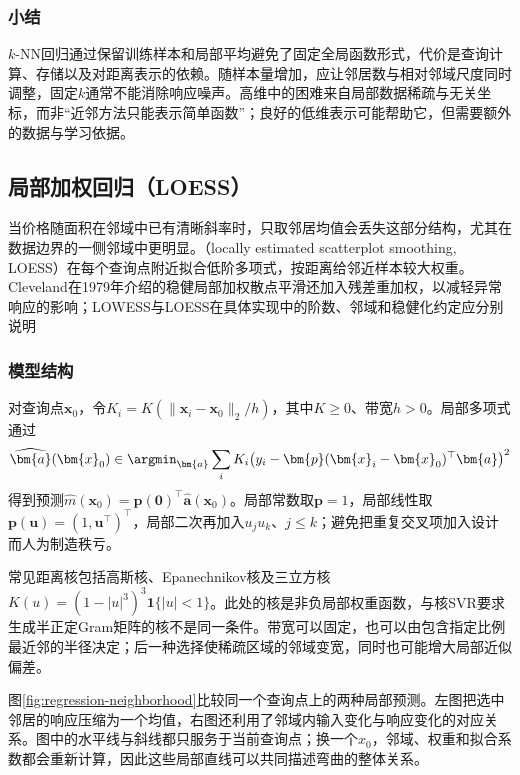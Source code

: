 \subsubsection{小结}

$k$-NN回归通过保留训练样本和局部平均避免了固定全局函数形式，代价是查询计算、存储以及对距离表示的依赖。随样本量增加，应让邻居数与相对邻域尺度同时调整，固定$k$通常不能消除响应噪声。高维中的困难来自局部数据稀疏与无关坐标，而非“近邻方法只能表示简单函数”；良好的低维表示可能帮助它，但需要额外的数据与学习依据。

\subsection{局部加权回归（LOESS）}
\label{sec:regression-loess}

当价格随面积在邻域中已有清晰斜率时，只取邻居均值会丢失这部分结构，尤其在数据边界的一侧邻域中更明显。（locally estimated scatterplot smoothing, LOESS）在每个查询点附近拟合低阶多项式，按距离给邻近样本较大权重。Cleveland在1979年介绍的稳健局部加权散点平滑还加入残差重加权，以减轻异常响应的影响；LOWESS与LOESS在具体实现中的阶数、邻域和稳健化约定应分别说明

\subsubsection{模型结构}

对查询点$\bm{x}_0$，令$K_i=K(\lVert\bm{x}_i-\bm{x}_0\rVert_2/h)$，其中$K\geq0$、带宽$h>0$。局部多项式通过
\begin{equation}
  \widehat{\bm{a}}(\bm{x}_0)
  \in\argmin_{\bm{a}}\sum_iK_i
     \bigl(y_i-\bm{p}(\bm{x}_i-\bm{x}_0)^{\top}\bm{a}\bigr)^2
  \label{eq:regression-local-polynomial}
\end{equation}
得到预测$\widehat m(\bm{x}_0)=\bm{p}(\bm{0})^{\top}\widehat{\bm{a}}(\bm{x}_0)$。局部常数取$\bm{p}=1$，局部线性取$\bm{p}(\bm{u})=(1,\bm{u}^{\top})^{\top}$，局部二次再加入$u_ju_k$、$j\leq k$；避免把重复交叉项加入设计而人为制造秩亏。

常见距离核包括高斯核、Epanechnikov核及三立方核$K(u)=(1-|u|^3)^3\mathbf{1}\{|u|<1\}$。此处的核是非负局部权重函数，与核SVR要求生成半正定Gram矩阵的核不是同一条件。带宽可以固定，也可以由包含指定比例最近邻的半径决定；后一种选择使稀疏区域的邻域变宽，同时也可能增大局部近似偏差。

图\ref{fig:regression-neighborhood}比较同一个查询点上的两种局部预测。左图把选中邻居的响应压缩为一个均值，右图还利用了邻域内输入变化与响应变化的对应关系。图中的水平线与斜线都只服务于当前查询点；换一个$x_0$，邻域、权重和拟合系数都会重新计算，因此这些局部直线可以共同描述弯曲的整体关系。

